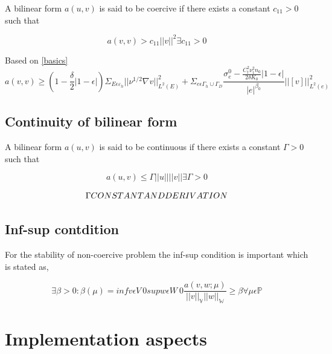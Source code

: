 \documentclass[a4paper,10pt]{book}
\begin{document}
A bilinear form $a(u,v)$ is said to be coercive if there exists a constant $c_{11} > 0$ such that

\begin{equation}\label{Coercivity}
a(v,v) > c_{11} ||v||^2   \exists   c_{11} > 0
\end{equation}

Based on \ref{basics}
\begin{equation}\label{Coercivity_constant}
a(v,v) \geq (1-\frac{\delta}{2} |1-\epsilon|) \Sigma_{E \epsilon \varepsilon_h} ||\nu^{1/2} \nabla v ||^2_{L^2(E)} + \Sigma_{e \epsilon \Gamma_h \cup \Gamma_D} \frac{\sigma_e^0 - \frac{C_t^2 \nu_1^2 n_0}{2 \delta K_0}|1-\epsilon|}{|e|^{\beta_0}} ||[v]||^2_{L^2(e)}
\end{equation}

\section{Continuity of bilinear form}

A bilinear form $a(u,v)$ is said to be continuous if there exists a constant $\Gamma > 0$ such that

\begin{equation}\label{Continuity}
a(u,v) \leq \Gamma ||u||||v||   \exists   \Gamma > 0
\end{equation}


\begin{equation}\label{Continuity_constant}
\begin{Huge}
\Gamma CONSTANT AND DERIVATION
\end{Huge}
\end{equation}

\section{Inf-sup contdition}

For the stability of non-coercive problem the inf-sup condition is important which is stated as, \cite{crbm} 

\begin{equation}
\exists \beta > 0 : \beta(\mu) = inf v \epsilon V \ {0}  sup w \epsilon W \ {0} \frac{a(v,w;\mu)}{||v||_{\mathbb{V}} ||w||_{\mathbb{W}} } \geq \beta \forall \mu \epsilon \mathbb{P}
\end{equation}



\chapter{Implementation aspects}
\end{document}
